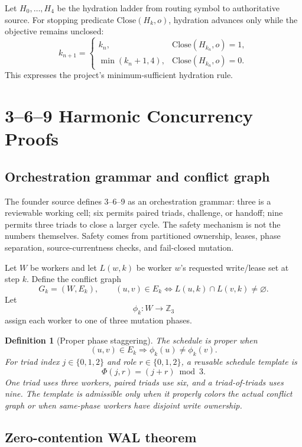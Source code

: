 \documentclass[11pt]{article}
\newtheorem{definition}{Definition}
\begin{document}
Let \(H_0,\ldots,H_4\) be the hydration ladder from routing symbol to authoritative source. For stopping predicate \(\mathrm{Close}(H_k,o)\), hydration advances only while the objective remains unclosed:
\[
k_{n+1}=
\begin{cases}
k_n,&\mathrm{Close}(H_{k_n},o)=1,\\
\min(k_n+1,4),&\mathrm{Close}(H_{k_n},o)=0.
\end{cases}
\]
This expresses the project's minimum-sufficient hydration rule.

\section{3--6--9 Harmonic Concurrency Proofs}

\subsection{Orchestration grammar and conflict graph}

The founder source defines 3--6--9 as an orchestration grammar: three is a reviewable working cell; six permits paired triads, challenge, or handoff; nine permits three triads to close a larger cycle. The safety mechanism is not the numbers themselves. Safety comes from partitioned ownership, leases, phase separation, source-currentness checks, and fail-closed mutation.

Let \(W\) be workers and let \(L(w,k)\) be worker \(w\)'s requested write/lease set at step \(k\). Define the conflict graph
\[
G_k=(W,E_k),\qquad
(u,v)\in E_k\Longleftrightarrow L(u,k)\cap L(v,k)\neq\varnothing.
\]
Let
\[
\phi_k:W\to\mathbb{Z}_3
\]
assign each worker to one of three mutation phases.

\begin{definition}[Proper phase staggering]
The schedule is proper when
\[
(u,v)\in E_k\Longrightarrow\phi_k(u)\neq\phi_k(v).
\]
For triad index \(j\in\{0,1,2\}\) and role \(r\in\{0,1,2\}\), a reusable schedule template is
\[
\Phi(j,r)=(j+r)\bmod 3.
\]
One triad uses three workers, paired triads use six, and a triad-of-triads uses nine. The template is admissible only when it properly colors the actual conflict graph or when same-phase workers have disjoint write ownership.
\end{definition}

\subsection{Zero-contention WAL theorem}
\end{document}
